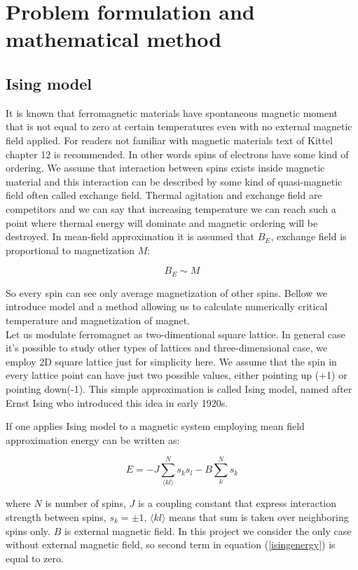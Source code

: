 \documentclass[10pt]{article}
\begin{document}
 

\newpage
\section{Problem formulation and mathematical method}\label{Part1}



\subsection{Ising model}
It is known that ferromagnetic materials have spontaneous magnetic moment that is not equal to zero at certain temperatures even with no external magnetic field applied. For readers not familiar with magnetic materials text of Kittel \cite{Kittel} chapter 12 is recommended.
In other words spins of electrons have some kind of ordering. We assume that interaction between spins exists inside magnetic material and 
this interaction can be described by some kind of quasi-magnetic field often called exchange field. Thermal agitation and exchange field are competitors and we can say that increasing temperature we can reach such a point where thermal energy will dominate and magnetic ordering will be destroyed.
In mean-field approximation it is assumed that $B_E$, exchange field is proportional to magnetization $M$:

\[
B_E \sim M
\]

So every spin can see only average magnetization of other spins. Bellow we introduce model and a method allowing us to calculate numerically critical temperature and 
magnetization of magnet. \\
Let us modulate ferromagnet as two-dimentional square lattice. In general case it's possible to study other types of lattices and three-dimensional case, we employ 2D square lattice
just for simplicity here. We assume that the spin in every lattice point can have just two possible values, either pointing up (+1) or pointing down(-1). This simple approximation is
called Ising model, named after Ernst Ising who introduced this idea in early 1920s.

If one applies Ising model to a magnetic system employing mean field approximation energy can be written as:

\begin{equation}\label{isingenergy}
E=-J\sum_{\langle kl\rangle }^{N}s_{k}s_{l} - B\sum_{k}^{N}s_k
\end{equation}

where $N$ is number of spins, $J$ is a coupling constant that express interaction
strength between spins, $s_{k}=\pm 1$, $\langle kl\rangle $
means that sum is taken over neighboring spins only. $B$ is external magnetic field.
In this project we consider the only case without external magnetic field, so second term in equation (\ref{isingenergy}) is equal to zero.\\
\end{document}
